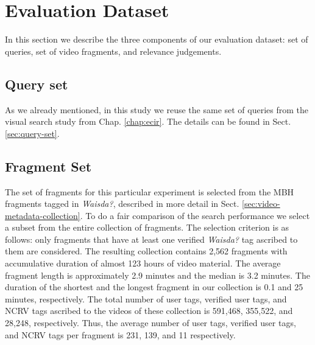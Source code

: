 \section{Evaluation Dataset}\label{topicir:sec:eval-set}
In this section we describe the three components of our evaluation dataset: set of queries, set of video fragments, and relevance judgements.
\subsection{Query set}
As we already mentioned, in this study we reuse the same set of queries from the visual search study from Chap. \ref{chap:ecir}. The details can be found in Sect. \ref{sec:query-set}.

\subsection{Fragment Set}
The set of fragments for this particular experiment is selected from the MBH fragments tagged in \textit{Waisda?}, described in more detail in Sect. \ref{sec:video-metadata-collection}. To do a fair comparison of the search performance we select a subset from the entire collection of fragments. The selection criterion is as follows: only fragments that have at least one verified \textit{Waisda?} tag ascribed to them are considered. The resulting collection contains 2,562 fragments with accumulative duration of almost 123 hours of video material.
The average fragment length is approximately 2.9 minutes and the median is 3.2 minutes. The duration of the shortest and the longest fragment in our collection is 0.1 and 25 minutes, respectively. The total number of user tags, verified user tags, and NCRV tags ascribed to the videos of these collection is 591,468, 355,522, and 28,248, respectively. Thus, the average number of user tags, verified user tags, and NCRV tags per fragment is 231, 139, and 11 respectively.

